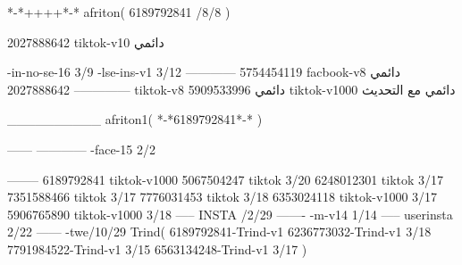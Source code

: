*-*++++*-*
afriton(
6189792841 /8/8
)

2027888642 tiktok-v10
دائمي

-in-no-se-16 3/9
-lse-ins-v1 3/12
------------
5754454119 facbook-v8
دائمي
--------------
2027888642 tiktok-v8
دائمي
5909533996 tiktok-v1000
دائمي مع التحديث

__________
afriton1(
*-*6189792841*-*
)


------
------------
-face-15 2/2

--------
6189792841 tiktok-v1000
5067504247 tiktok 3/20
6248012301 tiktok 3/17
7351588466 tiktok 3/17
7776031453 tiktok 3/18
6353024118 tiktok-v1000 3/17
5906765890 tiktok-v1000 3/18
-----
 INSTA /2/29
-------
-m-v14 1/14
-----
userinsta 2/22
------
-twe/10/29
Trind(
6189792841-Trind-v1 
6236773032-Trind-v1 3/18
7791984522-Trind-v1 3/15
6563134248-Trind-v1 3/17
)

